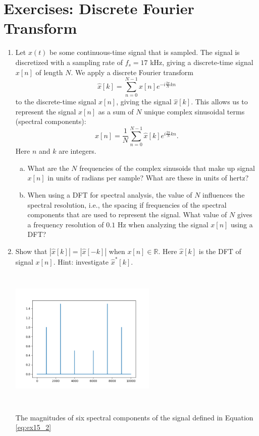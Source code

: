 \newpage
\section{Exercises: Discrete Fourier Transform}

\begin{enumerate}
\item Let $x(t)$ be some continuous-time signal that is sampled. The signal is discretized with a sampling rate of $f_{s}=17$ kHz, giving a discrete-time signal $x[n]$ of length $N$. We apply a discrete Fourier transform
\begin{equation}
\hat{x}[k] = \sum_{n=0}^{N-1} x[n] e^{-i\frac{2\pi}{N}kn}
\end{equation}
to the discrete-time signal $x[n]$, giving the signal
$\hat{x}[k]$. This allows us to represent the signal $x[n]$ as a sum of $N$
unique complex sinusoidal terms (spectral components):
\begin{equation}
x[n] = \frac{1}{N}\sum_{n=0}^{N-1} \hat{x}[k] e^{i\frac{2\pi}{N}kn}.
\end{equation}
Here $n$ and $k$ are integers.

\begin{enumerate}[a)]
    \item What are the $N$ frequencies of the complex sinusoids that make up signal $x[n]$ in units of radians per sample? What are these in units of hertz?
    
    \item When using a DFT for spectral analysis, the value of $N$ influences the spectral resolution, i.e., the spacing if frequencies of the spectral components that are used to represent the signal. What value of $N$ gives a frequency resolution of $0.1$ Hz when analyzing the signal $x[n]$ using a DFT?
\end{enumerate}

\item Show that $|\hat{x}[k]|=|\hat{x}[-k]|$ when $x[n] \in \mathbb{R}$. Here $\hat{x}[k]$ is the DFT of signal $x[n]$. Hint: investigate $\hat{x}^*[k]$.


\begin{marginfigure}
\includegraphics[width=7.0cm,height=6.8cm]{ch15/figures/ex152.png}
\caption{The magnitudes of six spectral components of the signal defined in Equation \ref{eq:ex15_2}}
\label{fig:ch15_ex15_2}
\end{marginfigure}


\end{enumerate}
